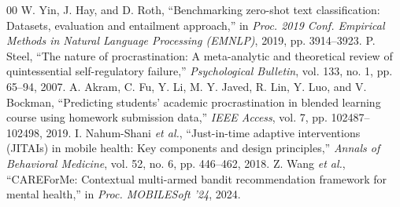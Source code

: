 \documentclass[conference]{IEEEtran}
\begin{document}
\begin{thebibliography}{00}
 W. Yin, J. Hay, and D. Roth, ``Benchmarking zero-shot text classification: Datasets, evaluation and entailment approach,'' in \textit{Proc. 2019 Conf. Empirical Methods in Natural Language Processing (EMNLP)}, 2019, pp. 3914--3923.
 P. Steel, ``The nature of procrastination: A meta-analytic and theoretical review of quintessential self-regulatory failure,'' \textit{Psychological Bulletin}, vol. 133, no. 1, pp. 65--94, 2007.
 A. Akram, C. Fu, Y. Li, M. Y. Javed, R. Lin, Y. Luo, and V. Bockman, ``Predicting students' academic procrastination in blended learning course using homework submission data,'' \textit{IEEE Access}, vol. 7, pp. 102487--102498, 2019.
 I. Nahum-Shani \textit{et al.}, ``Just-in-time adaptive interventions (JITAIs) in mobile health: Key components and design principles,'' \textit{Annals of Behavioral Medicine}, vol. 52, no. 6, pp. 446--462, 2018.
 Z. Wang \textit{et al.}, ``CAREForMe: Contextual multi-armed bandit recommendation framework for mental health,'' in \textit{Proc. MOBILESoft '24}, 2024.
\end{thebibliography}
\end{document}
